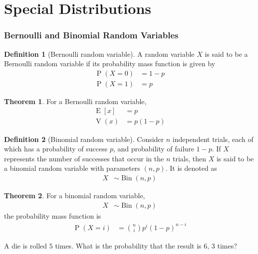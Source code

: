 \documentclass[titlepage, fleqn, a4paper, 12pt, twoside]{article}
\theoremstyle{definition}
\newtheorem{definition}{Definition}
\theoremstyle{theorem}
\newtheorem{theorem}{Theorem}
\DeclareMathOperator{\prob}{\mathrm{P}}
\DeclareMathOperator{\expct}{\mathrm{E}}
\DeclareMathOperator{\var}{\mathrm{V}}
\DeclareMathOperator{\bin}{\mathrm{Bin}}
\begin{document}
\clearpage
\part{Special Distributions}

\section{Bernoulli and Binomial Random Variables}

\begin{definition}[Bernoulli random variable]
	A random variable $X$ is said to be a Bernoulli random variable if its probability mass function is given by
	\begin{align*}
		\prob(X = 0) & = 1 - p \\
		\prob(X = 1) & = p
	\end{align*}
\end{definition}

\begin{theorem}
	For a Bernoulli random variable,
	\begin{align*}
		\expct[x] & = p \\
		\var(x)   & = p (1 - p)
	\end{align*}
\end{theorem}

\begin{definition}[Binomial random variable]
	Consider $n$ independent trials, each of which has a probability of success $p$, and probability of failure $1 - p$.
	If $X$ represents the number of successes that occur in the $n$ trials, then $X$ is said to be a binomial random variable with parameters $(n,p)$.
	It is denoted as
	\begin{align*}
		X & \sim \bin(n,p)
	\end{align*}
\end{definition}

\begin{theorem}
	For a binomial random variable,
	\begin{align*}
		X & \sim \bin(n,p)
	\end{align*}
	the probability mass function is
	\begin{align*}
		\prob(X = i) & = \binom{n}{i} p^i (1 - p)^{n - i}
	\end{align*}
\end{theorem}

\begin{question}
	A die is rolled $5$ times.
	What is the probability that the result is $6$, $3$ times?
\end{question}
\end{document}
